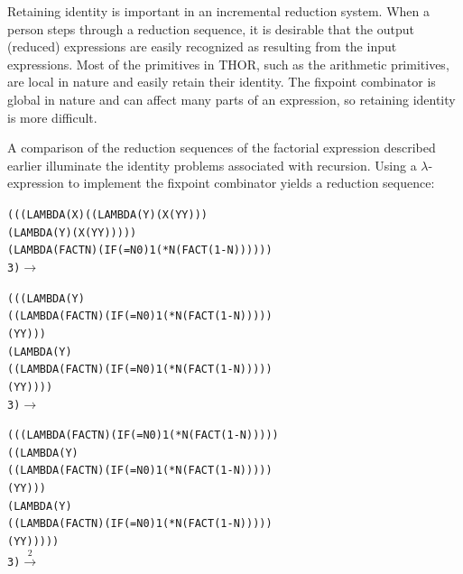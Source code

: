 Retaining identity is important in an incremental reduction system. When a
person steps through a reduction sequence, it is desirable that the output
(reduced) expressions are easily recognized as resulting from the input
expressions. Most of the primitives in THOR, such as the arithmetic primitives,
are local in nature and easily retain their identity. The fixpoint combinator is
global in nature and can affect many parts of an expression, so retaining
identity is more difficult.

A comparison of the reduction sequences of the factorial expression described
earlier illuminate the identity problems associated with recursion. Using a
\(\lambda\)-expression to implement the fixpoint combinator yields a reduction
sequence:
\par\smallskip\noindent\begin{minipage}{\linewidth}
\begin{alltt}
(((LAMBDA (X) ((LAMBDA (Y) (X (Y Y)))
              (LAMBDA (Y) (X (Y Y)))))
  (LAMBDA (FACT N) (IF (= N 0) 1 (* N (FACT (1- N))))))
 3) \(\longrightarrow\)
\end{alltt}
\end{minipage}\par\smallskip

\par\smallskip
\par\smallskip\noindent\begin{minipage}{\linewidth}
\begin{alltt}
(((LAMBDA (Y)
    ((LAMBDA (FACT N) (IF (= N 0) 1 (* N (FACT (1- N)))))
     (Y Y)))
  (LAMBDA (Y)
    ((LAMBDA (FACT N) (IF (= N 0) 1 (* N (FACT (1- N)))))
     (Y Y))))
 3) \(\longrightarrow\)
\end{alltt}
\end{minipage}\par\smallskip

\par\smallskip
\par\smallskip\noindent\begin{minipage}{\linewidth}
\begin{alltt}
(((LAMBDA (FACT N) (IF (= N 0) 1 (* N (FACT (1- N)))))
  ((LAMBDA (Y)
     ((LAMBDA (FACT N) (IF (= N 0) 1 (* N (FACT (1- N)))))
      (Y Y)))
   (LAMBDA (Y)
     ((LAMBDA (FACT N) (IF (= N 0) 1 (* N (FACT (1- N)))))
      (Y Y)))))
 3) \(\xrightarrow{2}\)
\end{alltt}
\end{minipage}\par\smallskip

